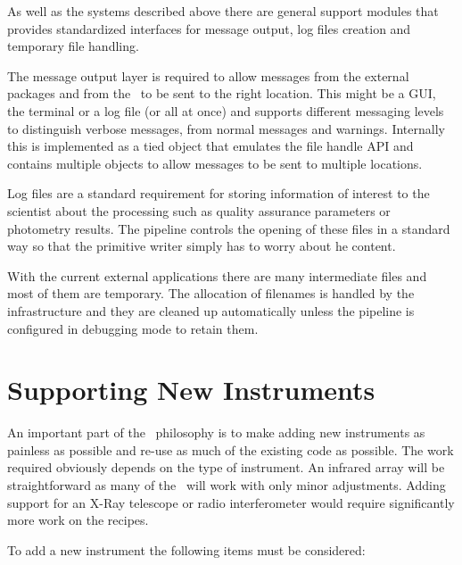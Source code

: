 \documentclass[final,authoryear,5p,times,twocolumn]{elsarticle}
\begin{document}
As well as the systems described above there are general support
modules that provides standardized interfaces for message output, log files
creation and temporary file handling.

The message output layer is required
to allow messages from the external packages and from the \primitives\
to be sent to the right location. This might be a GUI, the terminal or
a log file (or all at once) and supports different messaging levels to
distinguish verbose messages, from normal messages and
warnings. Internally this is implemented as a tied object that
emulates the file handle API and contains multiple objects to allow
messages to be sent to multiple locations.

Log files are a standard requirement for storing information of
interest to the scientist about the processing such as
quality assurance parameters or photometry results. The pipeline
controls the opening of these files in a standard way so that the
primitive writer simply has to worry about he content.

With the current external applications there are many intermediate files
and most of them are temporary. The allocation of filenames is handled
by the infrastructure and they are cleaned up automatically unless the
pipeline is configured in debugging mode to retain them.

\section{Supporting New Instruments}

An important part of the \oracdr\ philosophy is to make adding new
instruments as painless as possible and re-use as much of the
existing code as possible. The work required obviously depends on the
type of instrument. An infrared array will be straightforward as many
of the \recipes\ will work with only minor adjustments. Adding support
for an X-Ray telescope or radio interferometer would require
significantly more work on the recipes.

To add a new instrument the following items must be considered:
\end{document}
